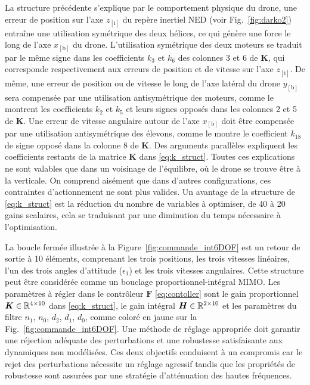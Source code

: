 La structure précédente s'explique par le comportement physique du drone, une erreur de position sur l'axe $z_{[\text{i}]}$ du repère inertiel NED (voir Fig.~\ref{fig:darko2}) entraîne une utilisation symétrique des deux hélices, ce qui génère une force le long de l'axe $x_{[\text{b}]}$ du drone. L'utilisation symétrique des deux moteurs se traduit par le même signe dans les coefficients $k_{3}$ et $k_{6}$ des colonnes 3 et 6 de $\boldsymbol{K}$, qui corresponde respectivement aux erreurs de position et de vitesse sur l'axe $z_{[\text{i}]}$. De même, une erreur de position ou de vitesse le long de l'axe latéral du drone $y_{[\text{b}]}$ sera compensée par une utilisation antisymétrique des moteurs, comme le montrent les coefficients $k_{2}$ et $k_{5}$ et leurs signes opposés dans les colonnes 2 et 5 de $\boldsymbol{K}$. Une erreur de vitesse angulaire autour de l'axe $x_{[\text{b}]}$ doit être compensée par une utilisation antisymétrique des élevons, comme le montre le coefficient $k_{18}$ de signe opposé dans la colonne 8 de $\boldsymbol{K}$. Des arguments parallèles expliquent les coefficients restants de la matrice $\boldsymbol{K}$ dans \eqref{eq:k_struct}. Toutes ces explications ne sont valables que dans un voisinage de l'équilibre, où le drone se trouve être à la verticale. On comprend aisément que dans d'autres configurations, ces contraintes d'actionnement ne sont plus valides. Un avantage de la structure de \eqref{eq:k_struct} est la réduction du nombre de variables à optimiser, de 40 à 20 gains scalaires, cela se traduisant par une diminution du temps nécessaire à l'optimisation.

La boucle fermée illustrée à la Figure~\ref{fig:commande_int6DOF} est un retour de sortie à 10 éléments, comprenant les trois positions, les trois vitesses linéaires, l'un des trois angles d'attitude ($\epsilon_{1}$) et les trois vitesses angulaires. Cette structure peut être considérée comme un bouclage proportionnel-intégral MIMO. Les paramètres à régler dans le contrôleur $\boldsymbol{F}$ \eqref{eq:contoller} sont le gain proportionnel $\boldsymbol{K} \in {\mathbb R}^{4\times10}$ dans \eqref{eq:k_struct}, le gain intégral $\boldsymbol{H} \in {\mathbb R}^{2\times10}$ et les paramètres du filtre $n_1$, $n_0$, $d_2$, $d_1$, $d_0$, comme coloré en jaune sur la Fig.~\ref{fig:commande_int6DOF}. Une méthode de réglage appropriée doit garantir une réjection adéquate des perturbations et une robustesse satisfaisante aux dynamiques non modélisées. Ces deux objectifs conduisent à un compromis car le rejet des perturbations nécessite un réglage agressif tandis que les propriétés de robustesse sont assurées par une stratégie d'atténuation des hautes fréquences.

